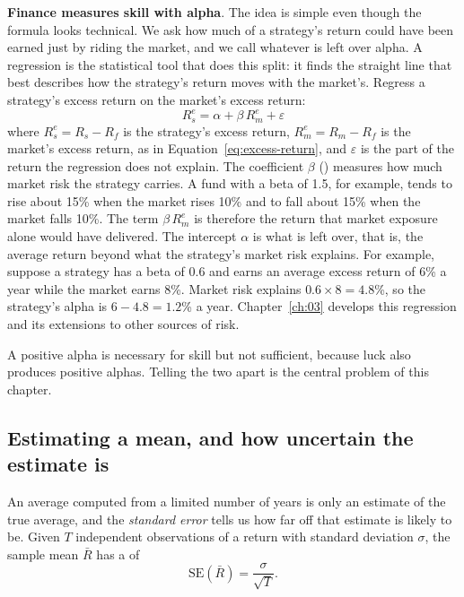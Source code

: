\textbf{Finance measures skill with alpha}. The idea is simple even though the formula looks technical. We ask how much of a strategy's return could have been earned just by riding the market, and we call whatever is left over alpha. A regression is the statistical tool that does this split: it finds the straight line that best describes how the strategy's return moves with the market's. Regress a strategy's excess return on the market's excess return:
\begin{equation}
  R^{e}_{s} = \alpha + \beta\, R^{e}_{m} + \varepsilon \nonumber
\label{eq:ch01_beta}
\end{equation}
where $R^{e}_{s} = R_s - R_f$ is the strategy's excess return, $R^{e}_{m} = R_m - R_f$ is the market's excess return, as in Equation~\eqref{eq:excess-return}, and $\varepsilon$ is the part of the return the regression does not explain. The coefficient $\beta$ () measures how much market risk the strategy carries. A fund with a beta of 1.5, for example, tends to rise about 15\% when the market rises 10\% and to fall about 15\% when the market falls 10\%. The term $\beta\, R^{e}_{m}$ is therefore the return that market exposure alone would have delivered. The intercept $\alpha$ is what is left over, that is, the average return beyond what the strategy's market risk explains. For example, suppose a strategy has a beta of 0.6 and earns an average excess return of 6\% a year while the market earns 8\%. Market risk explains $0.6 \times 8 = 4.8$\%, so the strategy's alpha is $6 - 4.8 = 1.2$\% a year. Chapter~\ref{ch:03} develops this regression and its extensions to other sources of risk.

A positive alpha is necessary for skill but not sufficient, because luck also produces positive alphas. Telling the two apart is the central problem of this chapter.

\subsection{Estimating a mean, and how uncertain the estimate is}
\label{sec:01-se}

An average computed from a limited number of years is only an estimate of the true average, and the \emph{standard error} tells us how far off that estimate is likely to be. Given $T$ independent observations of a return with standard deviation $\sigma$, the sample mean $\bar{R}$ has a  of
\begin{equation}
  \mathrm{SE}(\bar{R}) = \frac{\sigma}{\sqrt{T}}.
  \label{eq:01-se}
\end{equation}

